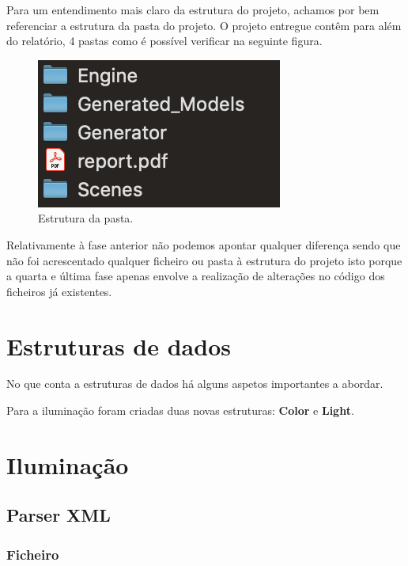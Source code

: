 \documentclass[a4paper]{article}
\begin{document}
Para um entendimento mais claro da estrutura do projeto, achamos por bem referenciar a estrutura da pasta do projeto.
O projeto entregue contêm para além do relatório, 4 pastas como é possível verificar na seguinte figura.

\begin{figure}[H]
\centering
\includegraphics[scale=1.0]{estrutura.png}
\caption{Estrutura da pasta.}
\label{img:estrutura}
\end{figure}

Relativamente à fase anterior não podemos apontar qualquer diferença sendo que não foi acrescentado qualquer ficheiro ou pasta à estrutura do projeto isto porque a quarta e última fase apenas envolve a realização de alterações no código dos ficheiros já existentes.

\newpage

\section{Estruturas de dados}
\label{sec:estruturadados}

No que conta a estruturas de dados há alguns aspetos importantes a abordar.

Para a iluminação foram criadas duas novas estruturas: \textbf{Color} e \textbf{Light}.



\section{Iluminação}
\label{sec:iluminacao}

\subsection{Parser XML}
\label{sec:parseri}

\subsubsection{Ficheiro}
\label{sec:ficheiroi}
\end{document}
